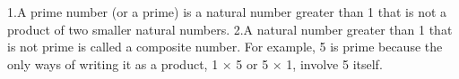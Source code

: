 1.\+A prime number (or a prime) is a natural number greater than 1 that is not a product of two smaller natural numbers. 2.\+A natural number greater than 1 that is not prime is called a composite number. For example, 5 is prime because the only ways of writing it as a product, 1 × 5 or 5 × 1, involve 5 itself. 
